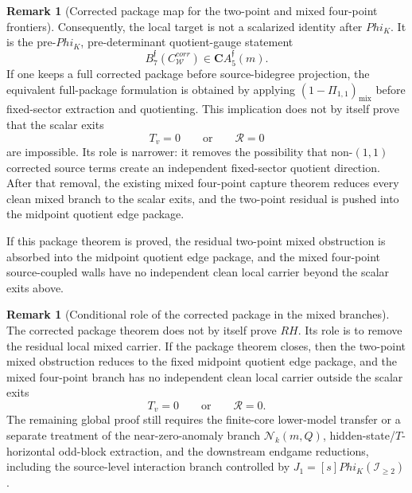 \documentclass[11pt,a4paper]{amsart}
\def\Phi{Phi}%
\def\RH{RH}%
\def\corr{corr}%
\theoremstyle{plain}
\theoremstyle{definition}
\newtheorem{remark}[theorem]{Remark}
\newcommand{\RH}{\mathrm{RH}}
\newcommand{\corr}{\mathrm{corr}}
\begin{document}
\begin{remark}[Corrected package map for the two-point and mixed four-point frontiers]
Consequently, the local target is not a scalarized identity after \(\Phi_K\).
It is the pre-\(\Phi_K\), pre-determinant quotient-gauge statement
\[
B_7^{\mathfrak f}(C_{\mathcal W}^{\corr})
\in
\mathbf C A_5^{\mathfrak f}(m).
\]
If one keeps a full corrected package before source-bidegree projection, the
equivalent full-package formulation is obtained by applying
\((1-\Pi_{1,1})_{\mathrm{mix}}\) before fixed-sector extraction and
quotienting.
This implication does not by itself prove that the scalar exits
\[
T_v=0
\qquad\text{or}\qquad
\mathcal R=0
\]
are impossible.  Its role is narrower: it removes the possibility that
non-\((1,1)\) corrected source terms create an independent fixed-sector
quotient direction.  After that removal, the existing mixed four-point
capture theorem reduces every clean mixed branch to the scalar exits, and
the two-point residual is pushed into the midpoint quotient edge package.

If this package theorem is proved, the residual two-point mixed obstruction is
absorbed into the midpoint quotient edge package, and the mixed four-point
source-coupled walls have no independent clean local carrier beyond the scalar
exits above.
\end{remark}

\begin{remark}[Conditional role of the corrected package in the mixed branches]
\label{rem:conditional-role-corrected-package-mixed-branches}
The corrected package theorem does not by itself prove \(\RH\).  Its role is
to remove the residual local mixed carrier.  If the package theorem closes,
then the two-point mixed obstruction reduces to the fixed midpoint quotient
edge package, and the mixed four-point branch has no independent clean local
carrier outside the scalar exits
\[
T_v=0
\qquad\text{or}\qquad
\mathcal R=0.
\]
The remaining global proof still requires the finite-core lower-model
transfer or a separate treatment of the near-zero-anomaly branch
\(\mathcal N_k(m,Q)\), hidden-state/\(T\)-horizontal odd-block extraction,
and the downstream endgame reductions, including the source-level
interaction branch controlled by \(J_1=[s]\Phi_K(\mathcal I_{\ge2})\).
\end{remark}
\end{document}
